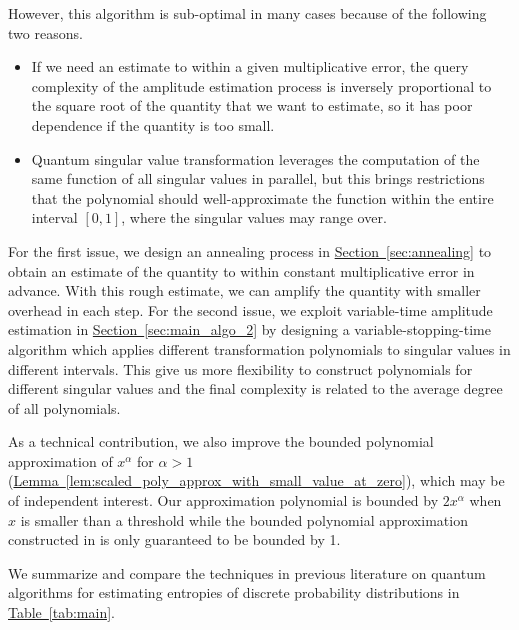 \documentclass[journal]{IEEEtran}
\newcommand{\lem}[1]{\hyperref[lem:#1]{Lemma~\ref*{lem:#1}}}
\newcommand{\tab}[1]{\hyperref[tab:#1]{Table~\ref*{tab:#1}}}
\renewcommand{\sec}[1]{\hyperref[sec:#1]{Section~\ref*{sec:#1}}}
\begin{document}
However, this algorithm is sub-optimal in many cases because of the following two reasons. 
\begin{itemize}[leftmargin=15pt]
    \item If we need an estimate to within a given multiplicative error, the query complexity of the amplitude estimation process is inversely proportional to the square root of the quantity that we want to estimate, so it has poor dependence if the quantity is too small.
    
    \item Quantum singular value transformation leverages the computation of the same function of all singular values in parallel, but this brings restrictions that the polynomial should well-approximate the function within the entire interval $[0,1]$, where the singular values may range over.
\end{itemize}
For the first issue, we design an annealing process in \sec{annealing} to obtain an estimate of the quantity to within constant multiplicative error in advance. With this rough estimate, we can amplify the quantity with smaller overhead in each step. For the second issue, we exploit variable-time amplitude estimation in \sec{main_algo_2} by designing a variable-stopping-time algorithm which applies different transformation polynomials to singular values in different intervals. This give us more flexibility to construct polynomials for different singular values and the final complexity is related to the average degree of all polynomials. 

As a technical contribution, we also improve the bounded polynomial approximation of $x^\alpha$ for $\alpha > 1$ (\lem{scaled_poly_approx_with_small_value_at_zero}), which may be of independent interest. Our approximation polynomial is bounded by $2x^{\alpha}$ when $x$ is smaller than a threshold while the bounded polynomial approximation constructed in \cite{gilyen2019singular} is only guaranteed to be bounded by 1. 

We summarize and compare the techniques in previous literature on quantum algorithms for estimating entropies of discrete probability distributions in \tab{main}.
\end{document}
